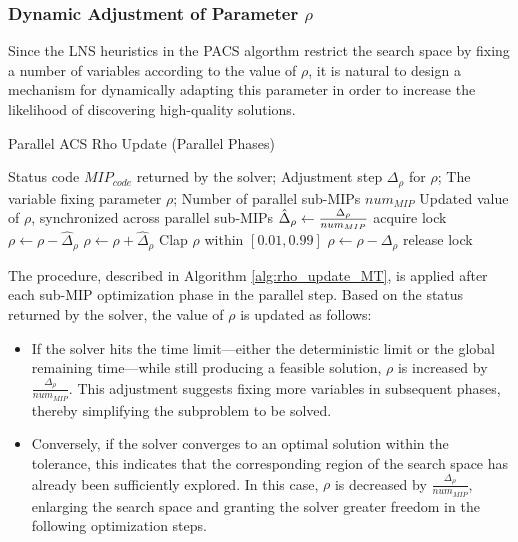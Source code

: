 \subsubsection{Dynamic Adjustment of Parameter $\rho$}
Since the LNS heuristics in the PACS algorthm restrict the search space by fixing a number of variables according to the value of $\rho$, it is natural to design a mechanism for dynamically adapting this parameter in order to increase the likelihood of discovering high-quality solutions.  
\begin{algorithm}[H]
\caption{Parallel ACS Rho Update (Parallel Phases)}\label{alg:rho_update_MT}
\begin{algorithmic}[1]
\Require Status code $MIP_{code}$ returned by the solver; Adjustment step $\Delta_\rho$ for $\rho$; The variable fixing parameter $\rho$; Number of parallel sub-MIPs $num_{MIP}$
\Ensure Updated value of $\rho$, synchronized across parallel sub-MIPs
    \State $\hat\Delta_\rho \gets {\Delta_\rho \over{num_{MIP}}}$
    \State acquire lock
        \State $\rho \gets \rho - \hat\Delta_\rho$
    \EndIf
        \State $\rho \gets \rho + \hat\Delta_\rho$
    \EndIf
    \State Clap $\rho$ within $[0.01,0.99]$
        \State $\rho \gets \rho - \Delta_\rho$
    \EndIf
    \State release lock
\EndFunction
\end{algorithmic}
\end{algorithm}
The procedure, described in Algorithm \ref{alg:rho_update_MT}, is applied after each sub-MIP optimization phase in the parallel step. Based on the status returned by the solver, the value of $\rho$ is updated as follows:
\begin{itemize}
    \item  If the solver hits the time limit—either the deterministic limit or the global remaining time—while still producing a feasible solution, $\rho$ is increased by $\frac{\Delta_\rho}{num_{MIP}}$. This adjustment suggests fixing more variables in subsequent phases, thereby simplifying the subproblem to be solved. 
    \item Conversely, if the solver converges to an optimal solution within the tolerance, this indicates that the corresponding region of the search space has already been sufficiently explored. In this case, $\rho$ is decreased by $\frac{\Delta_\rho}{num_{MIP}}$, enlarging the search space and granting the solver greater freedom in the following optimization steps.  
\end{itemize}
